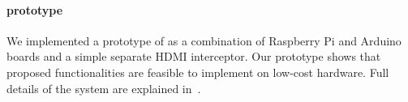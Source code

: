 

\paragraph{\protection prototype} 
We implemented a prototype of \hub as a combination of Raspberry Pi and Arduino boards and a simple separate HDMI interceptor. Our prototype shows that proposed functionalities are feasible to implement on low-cost hardware. Full details of the \protection system are explained in~\cite{protection}.


